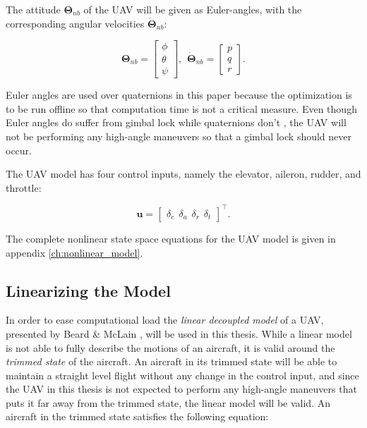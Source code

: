 The attitude $\bm{\Theta}_{nb}$ of the UAV will be given as Euler-angles, with the corresponding angular velocities $\bm{\dot{\Theta}}_{nb}$:

\begin{equation}
	\bm{\Theta}_{nb} =
	\begin{bmatrix}
		\phi \\ \theta \\ \psi
	\end{bmatrix},
	\hspace{5pt}
	\dot{\bm{\Theta}}_{nb} =
	\begin{bmatrix}
		p \\ q \\ r
	\end{bmatrix}.
\end{equation}

Euler angles are used over quaternions in this paper because the optimization is to be run offline so that computation time is not a critical measure. Even though Euler angles do suffer from gimbal lock while quaternions don't \cite{uavBEARD}, the UAV will not be performing any high-angle maneuvers so that a gimbal lock should never occur.

The UAV model has four control inputs, namely the elevator, aileron, rudder, and throttle:

\begin{equation}
	\mathbf{u} =
	\begin{bmatrix}
		\delta_e \hspace{5pt} \delta_a \hspace{5pt} \delta_r \hspace{5pt} \delta_t
	\end{bmatrix}^\intercal .
\end{equation}

The complete nonlinear state space equations for the UAV model is given in appendix \ref{ch:nonlinear_model}.

\subsection{Linearizing the Model}

In order to ease computational load the \textit{linear decoupled model} of a UAV, presented by Beard \& McLain \cite{uavBEARD}, will be used in this thesis. While a linear model is not able to fully describe the motions of an aircraft, it is valid around the \textit{trimmed state} of the aircraft. An aircraft in its trimmed state will be able to maintain a straight level flight without any change in the control input, and since the UAV in this thesis is not expected to perform any high-angle maneuvers that puts it far away from the trimmed state, the linear model will be valid. An aircraft in the trimmed state satisfies the following equation:

